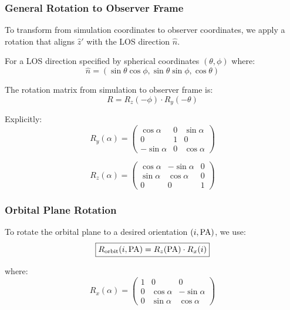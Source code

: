 \documentclass[twocolumn,amsmath,amssymb,prd,superscriptaddress,nofootinbib]{revtex4-2}
\begin{document}
\subsubsection{General Rotation to Observer Frame}

To transform from simulation coordinates to observer coordinates, we apply a rotation that aligns $\hat{z}'$ with the LOS direction $\hat{n}$.

For a LOS direction specified by spherical coordinates $(\theta, \phi)$ where:
\begin{equation}
    \hat{n} = (\sin\theta\cos\phi, \sin\theta\sin\phi, \cos\theta)
\end{equation}

The rotation matrix from simulation to observer frame is:
\begin{equation}
    R = R_z(-\phi) \cdot R_y(-\theta)
    \label{eq:rotation_general}
\end{equation}

Explicitly:
\begin{equation}
    R_y(\alpha) = \begin{pmatrix}
    \cos\alpha & 0 & \sin\alpha \\
    0 & 1 & 0 \\
    -\sin\alpha & 0 & \cos\alpha
    \end{pmatrix}
\end{equation}

\begin{equation}
    R_z(\alpha) = \begin{pmatrix}
    \cos\alpha & -\sin\alpha & 0 \\
    \sin\alpha & \cos\alpha & 0 \\
    0 & 0 & 1
    \end{pmatrix}
\end{equation}

\subsubsection{Orbital Plane Rotation}

To rotate the orbital plane to a desired orientation $(i, {\rm PA})$, we use:
\begin{equation}
    \boxed{R_{\rm orbit}(i, {\rm PA}) = R_z({\rm PA}) \cdot R_x(i)}
    \label{eq:R_orbit}
\end{equation}

where:
\begin{equation}
    R_x(\alpha) = \begin{pmatrix}
    1 & 0 & 0 \\
    0 & \cos\alpha & -\sin\alpha \\
    0 & \sin\alpha & \cos\alpha
    \end{pmatrix}
\end{equation}
\end{document}
